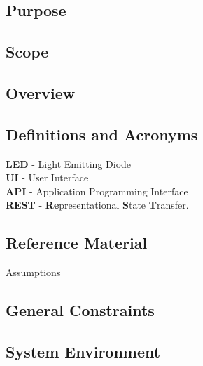 \documentclass[onecolumn, draftclsnofoot,10pt, compsoc]{IEEEtran}
\begin{document}
		\subsection{Purpose}
		\subsection{Scope}
		\subsection{Overview}
		\subsection{Definitions and Acronyms}
		\textbf{LED} - Light Emitting Diode
		\\\textbf{UI} - User Interface
		\\\textbf{API} - Application Programming Interface
		\\\textbf{REST} - \textbf{Re}presentational \textbf{S}tate \textbf{T}ransfer.


		\subsection{Reference Material}
			\begingroup
				\renewcommand{\addcontentsline}[3]{}%
				\renewcommand{\section}[2]{}%
				
				
			\endgroup

	\section{System Overview}
		\subsection{Assumptions}
		\subsection{General Constraints}
		\subsection{System Environment}
\end{document}
